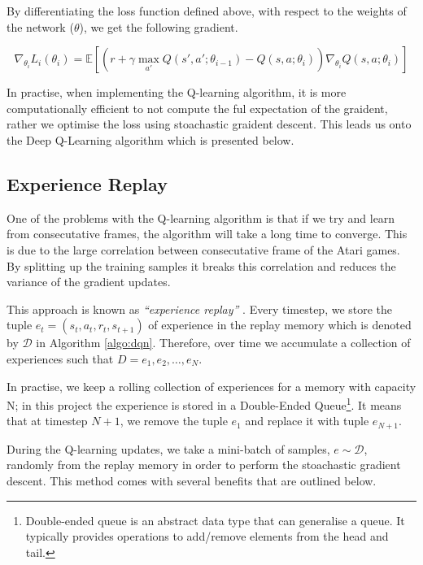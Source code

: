By differentiating the loss function defined above, with respect to the weights of the network ($\theta$), we get the following gradient.

\begin{defn}
	\[
		\nabla_{\theta_i} L_i(\theta_i) = \mathbb{E} \left[ \left( r + \gamma \max_{a'} Q(s', a'; \theta_{i - 1}) - Q(s, a; \theta_i)\right) \nabla_{\theta_i} Q(s, a; \theta_i) \right]
	\]
\end{defn}

In practise, when implementing the Q-learning algorithm, it is more computationally efficient to not compute the ful expectation of the graident, rather we optimise the loss using stoachastic graident descent. This leads us onto the Deep Q-Learning algorithm which is presented below.



\subsection{Experience Replay}
\label{dsgn:subsec:exp-replay}

One of the problems with the Q-learning algorithm is that if we try and learn from consecutative frames, the algorithm will take a long time to converge. This is due to the large correlation between consecutative frame of the Atari games. By splitting up the training samples it breaks this correlation and reduces the variance of the gradient updates.

This approach is known as \textit{``experience replay''} \cite{Lin1992ReinforcementLF}. Every timestep, we store the tuple $e_t = (s_t, a_t, r_t, s_{t+1})$ of experience in the replay memory which is denoted by $\mathcal{D}$ in Algorithm \ref{algo:dqn}. Therefore, over time we accumulate a collection of experiences such that $D = e_1, e_2, \hdots, e_N$.

In practise, we keep a rolling collection of experiences for a memory with capacity N; in this project the experience is stored in a Double-Ended Queue\footnote{Double-ended queue is an abstract data type that can generalise a queue. It typically provides operations to add/remove elements from the head and tail.}. It means that at timestep $N+1$, we remove the tuple $e_1$ and replace it with tuple $e_{N+1}$.

During the Q-learning updates, we take a mini-batch of samples, $e \sim \mathcal{D}$, randomly from the replay memory in order to perform the stoachastic gradient descent. This method comes with several benefits that are outlined below.

